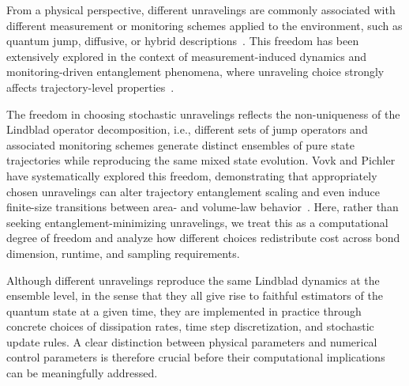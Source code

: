 \documentclass[aps, pra, superscriptaddress, reprint, floatfix]{revtex4-2}
\theoremstyle{plain}
\begin{document}
From a physical perspective, different unravelings are commonly associated with different measurement or monitoring schemes applied to the environment, such as quantum jump, diffusive, or hybrid descriptions~\cite{Wiseman_Milburn_2009, daley_2014}. This freedom has been extensively explored in the context of measurement-induced dynamics and monitoring-driven entanglement phenomena, where unraveling choice strongly affects trajectory-level properties~\cite{block_2022, liu_2024, guimaraes_2023, leung_2024}.

The freedom in choosing stochastic unravelings reflects the non-uniqueness of the Lindblad operator decomposition, i.e., different sets of jump operators and associated monitoring schemes generate distinct ensembles of pure state trajectories while reproducing the same mixed state evolution. Vovk and 
Pichler have systematically explored this freedom, demonstrating that appropriately chosen unravelings can alter trajectory entanglement scaling and even induce finite-size transitions between area- and volume-law behavior~\cite{vovk_2022, vovk_2024,AreaReview}.
Here, rather than seeking entanglement-minimizing unravelings, we treat this as a computational degree of freedom and analyze how different choices redistribute cost across bond dimension, runtime, and sampling requirements.

Although different unravelings reproduce the same Lindblad dynamics at the ensemble level, in the sense that they all give rise to faithful estimators of the quantum state at a given time, they are implemented in practice through concrete choices of dissipation rates, time step discretization, and stochastic update rules. A clear distinction between physical parameters and numerical control parameters is therefore crucial before their computational implications can be meaningfully addressed.
\end{document}
